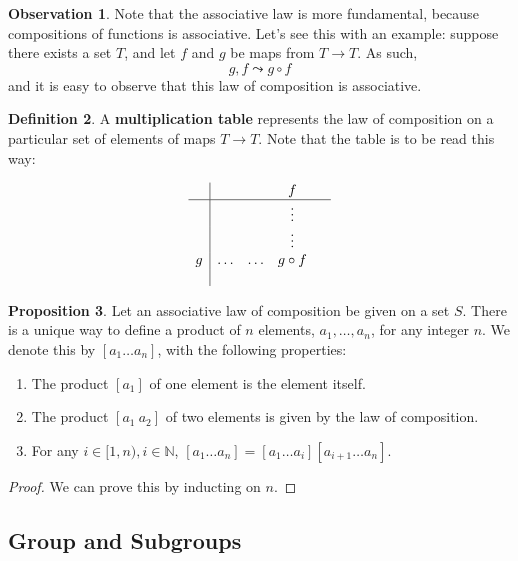 \documentclass[11pt]{amsart} %
\theoremstyle{definition}
\newtheorem{definition}{Definition}[section]
\newtheorem{proposition}[definition]{Proposition}
\newtheorem{obs}[definition]{Observation}
\theoremstyle{definition}
\numberwithin{equation}{section}
\begin{document}
\begin{obs}
	Note that the associative law is more fundamental, because compositions of functions is associative. Let's see this with an example: suppose there exists a set $T$, and let $f$ and $g$ be maps from $T \to T$. As such,
	$$ g , f \leadsto  g \circ f  $$
	and it is easy to observe that this law of composition is associative. 
\end{obs}

\begin{definition}
	A \textbf{multiplication table} represents the law of composition on a particular set of elements of maps $T \to T$. Note that the table is to be read this way:
	
	$$\begin{array}{ c | c c c c}
	  & \: & \: & f & \: \\
	 \hline
	   & & & \vdots & \\
	  	  & & & \vdots & \\
	  	  	g  & \dots & \dots & g \circ f & \\
	  	  		  & & & & \\
	\end{array}$$
\end{definition}

\begin{proposition}
	Let an associative law of composition be given on a set $S$. There is a unique way to define a product of $n$ elements, $a_1, \dots, a_n$, for any integer $n$. We denote this by $[a_1 \dots a_n]$, with the following properties:
	\begin{enumerate}[  label=(\roman*)]
		\item The product $[a_1]$ of one element is the element itself.
		\item The product $[a_1 \: a_2]$ of two elements is given by the law of composition.
		\item For any $i \in [1,n), i\in \mathbb{N}$, $[a_1 \dots a_n] = [a_1 \dots a_i] [a_{i+1} \dots a_n]$.
	\end{enumerate}
\end{proposition}

\begin{proof}
	We can prove this by inducting on $n$. 
\end{proof}


\subsection{Group and Subgroups}
\end{document}
